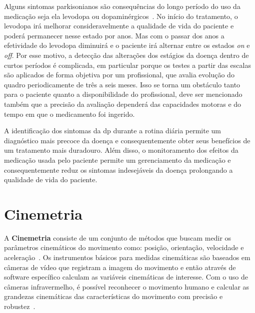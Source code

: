Alguns sintomas parkisonianos são consequências do longo período do uso da medicação seja ela levodopa ou dopaminérgicos~\cite{protpar010}. No início do tratamento, o levodopa irá melhorar consideravelmente a qualidade de vida do paciente e poderá permanecer nesse estado por anos. Mas com o passar dos anos a efetividade do levodopa diminuirá e o paciente irá alternar entre os estados \textit{on} e \textit{off}. Por esse motivo, a detecção das alterações dos estágios da doença dentro de curtos períodos é complicada, em particular porque os testes a partir das escalas são aplicados de forma objetiva por um profissional, que avalia  evolução do quadro periodicamente de três a seis meses. Isso se torna um obstáculo tanto para o paciente quanto a disponibilidade do profissional, deve ser mencionado também que a precisão da avaliação dependerá das capacidades motoras e do tempo em que o medicamento foi ingerido.

A identificação dos sintomas da \ac{dp} durante a rotina diária permite um diagnóstico mais precoce da doença e consequentemente obter seus benefícios de um tratamento mais duradouro. Além disso, o monitoramento dos efeitos da medicação usada pelo paciente permite um gerenciamento da medicação e consequentemente reduz os sintomas indesejáveis da doença prolongando a qualidade de vida do paciente.


\section{Cinemetria}
A \textbf{Cinemetria} consiste de um conjunto de métodos que buscam medir os parâmetros cinemáticos do movimento como: posição, orientação, velocidade e aceleração~\cite{biomecanica99}. Os instrumentos básicos para medidas cinemáticas são baseados em câmeras de vídeo que registram a imagem do movimento e então através de software específico calculam as variáveis cinemáticas de interesse. Com o uso de câmeras infravermelho, é possível reconhecer o movimento humano e calcular as grandezas cinemáticas das características do movimento com precisão e robustez~\cite{gabel2012}.

